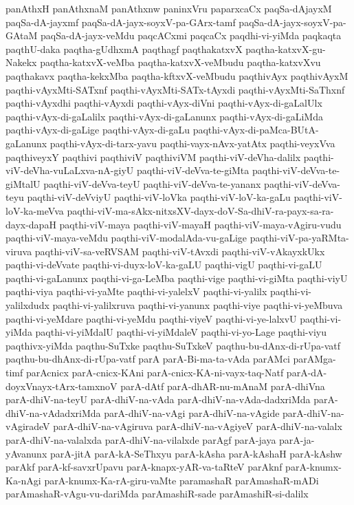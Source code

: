 {panAthxH
panAthxnaM
panAthxnw
paninxVru
paparxcaCx
paqSa-dAjayxM
paqSa-dA-jayxmf
paqSa-dA-jayx-soyxV-pa-GArx-tamf
paqSa-dA-jayx-soyxV-pa-GAtaM
paqSa-dA-jayx-veMdu
paqcACxmi
paqcaCx
paqdhi-vi-yiMda
paqkaqta
paqthU-daka
paqtha-gUdhxmA
paqthagf
paqthakatxvX
paqtha-katxvX-gu-Nakekx
paqtha-katxvX-veMba
paqtha-katxvX-veMbudu
paqtha-katxvXvu
paqthakavx
paqtha-kekxMba
paqtha-kftxvX-veMbudu
paqthivAyx
paqthivAyxM
paqthi-vAyxMti-SATxnf
paqthi-vAyxMti-SATx-tAyxdi
paqthi-vAyxMti-SaThxnf
paqthi-vAyxdhi
paqthi-vAyxdi
paqthi-vAyx-diVni
paqthi-vAyx-di-gaLalUlx
paqthi-vAyx-di-gaLalilx
paqthi-vAyx-di-gaLanunx
paqthi-vAyx-di-gaLiMda
paqthi-vAyx-di-gaLige
paqthi-vAyx-di-gaLu
paqthi-vAyx-di-paMca-BUtA-gaLanunx
paqthi-vAyx-di-tarx-yavu
paqthi-vayx-nAvx-yatAtx
paqthi-veyxVva
paqthiveyxY
paqthivi
paqthiviV
paqthiviVM
paqthi-viV-deVha-dalilx
paqthi-viV-deVha-vuLaLxva-nA-giyU
paqthi-viV-deVva-te-giMta
paqthi-viV-deVva-te-giMtalU
paqthi-viV-deVva-teyU
paqthi-viV-deVva-te-yananx
paqthi-viV-deVva-teyu
paqthi-viV-deVviyU
paqthi-viV-loVka
paqthi-viV-loV-ka-gaLu
paqthi-viV-loV-ka-meVva
paqthi-viV-ma-sAkx-nitxsXV-dayx-doV-Sa-dhiV-ra-payx-sa-ra-dayx-dapaH
paqthi-viV-maya
paqthi-viV-mayaH
paqthi-viV-maya-vAgiru-vudu
paqthi-viV-maya-veMdu
paqthi-viV-modalAda-vu-gaLige
paqthi-viV-pa-yaRMta-viruva
paqthi-viV-sa-veRVSAM
paqthi-viV-tAvxdi
paqthi-viV-vAkayxkUkx
paqthi-vi-deVvate
paqthi-vi-duyx-loV-ka-gaLU
paqthi-vigU
paqthi-vi-gaLU
paqthi-vi-gaLanunx
paqthi-vi-ga-LeMba
paqthi-vige
paqthi-vi-giMta
paqthi-viyU
paqthi-viya
paqthi-vi-yaMte
paqthi-vi-yalelxV
paqthi-vi-yalilx
paqthi-vi-yalilxdudx
paqthi-vi-yalilxruva
paqthi-vi-yanunx
paqthi-viye
paqthi-vi-yeMbuva
paqthi-vi-yeMdare
paqthi-vi-yeMdu
paqthi-viyeV
paqthi-vi-ye-lalxvU
paqthi-vi-yiMda
paqthi-vi-yiMdalU
paqthi-vi-yiMdaleV
paqthi-vi-yo-Lage
paqthi-viyu
paqthivx-yiMda
paqthu-SuTxke
paqthu-SuTxkeV
paqthu-bu-dAnx-di-rUpa-vatf
paqthu-bu-dhAnx-di-rUpa-vatf
parA
parA-Bi-ma-ta-vAda
parAMci
parAMga-timf
parAcnicx
parA-cnicx-KAni
parA-cnicx-KA-ni-vayx-taq-Natf
parA-dA-doyxVnayx-tArx-tamxnoV
parA-dAtf
parA-dhAR-nu-mAnaM
parA-dhiVna
parA-dhiV-na-teyU
parA-dhiV-na-vAda
parA-dhiV-na-vAda-dadxriMda
parA-dhiV-na-vAdadxriMda
parA-dhiV-na-vAgi
parA-dhiV-na-vAgide
parA-dhiV-na-vAgiradeV
parA-dhiV-na-vAgiruva
parA-dhiV-na-vAgiyeV
parA-dhiV-na-valalx
parA-dhiV-na-valalxda
parA-dhiV-na-vilalxde
parAgf
parA-jaya
parA-ja-yAvanunx
parA-jitA
parA-kA-SeThxyu
parA-kAsha
parA-kAshaH
parA-kAshw
parAkf
parA-kf-savxrUpavu
parA-knapx-yAR-va-taRteV
parAknf
parA-knumx-Ka-nAgi
parA-knumx-Ka-rA-giru-vaMte
paramashaR
parAmashaR-mADi
parAmashaR-vAgu-vu-dariMda
parAmashiR-sade
parAmashiR-si-dalilx
}
